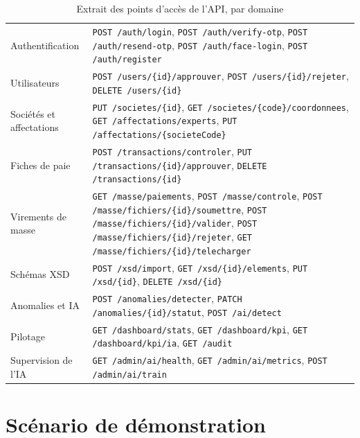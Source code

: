\begin{table}[H]
\centering
\footnotesize
\renewcommand{\arraystretch}{1.2}
\tablestyle
\begin{tabularx}{\textwidth}{|>{\raggedright\arraybackslash}p{2.6cm}|Y|}
\hline
{} &  \\
\hline
Authentification & \texttt{POST /auth/login}, \texttt{POST /auth/verify-otp}, \texttt{POST /auth/resend-otp}, \texttt{POST /auth/face-login}, \texttt{POST /auth/register} \\
\hline
Utilisateurs & \texttt{POST /users/\{id\}/approuver}, \texttt{POST /users/\{id\}/rejeter}, \texttt{DELETE /users/\{id\}} \\
\hline
Sociétés et affectations & \texttt{PUT /societes/\{id\}}, \texttt{GET /societes/\{code\}/coordonnees}, \texttt{GET /affectations/experts}, \texttt{PUT /affectations/\{societeCode\}} \\
\hline
Fiches de paie & \texttt{POST /transactions/controler}, \texttt{PUT /transactions/\{id\}/approuver}, \texttt{DELETE /transactions/\{id\}} \\
\hline
Virements de masse & \texttt{GET /masse/paiements}, \texttt{POST /masse/controle}, \texttt{POST /masse/fichiers/\{id\}/soumettre}, \texttt{POST /masse/fichiers/\{id\}/valider}, \texttt{POST /masse/fichiers/\{id\}/rejeter}, \texttt{GET /masse/fichiers/\{id\}/telecharger} \\
\hline
Schémas XSD & \texttt{POST /xsd/import}, \texttt{GET /xsd/\{id\}/elements}, \texttt{PUT /xsd/\{id\}}, \texttt{DELETE /xsd/\{id\}} \\
\hline
Anomalies et IA & \texttt{POST /anomalies/detecter}, \texttt{PATCH /anomalies/\{id\}/statut}, \texttt{POST /ai/detect} \\
\hline
Pilotage & \texttt{GET /dashboard/stats}, \texttt{GET /dashboard/kpi}, \texttt{GET /dashboard/kpi/ia}, \texttt{GET /audit} \\
\hline
Supervision de l'IA & \texttt{GET /admin/ai/health}, \texttt{GET /admin/ai/metrics}, \texttt{POST /admin/ai/train} \\
\hline
\end{tabularx}
\caption{Extrait des points d'accès de l'API, par domaine}
\label{tab:ann-api}
\end{table}

\chapter{Scénario de démonstration}
\label{ann:scenario}


